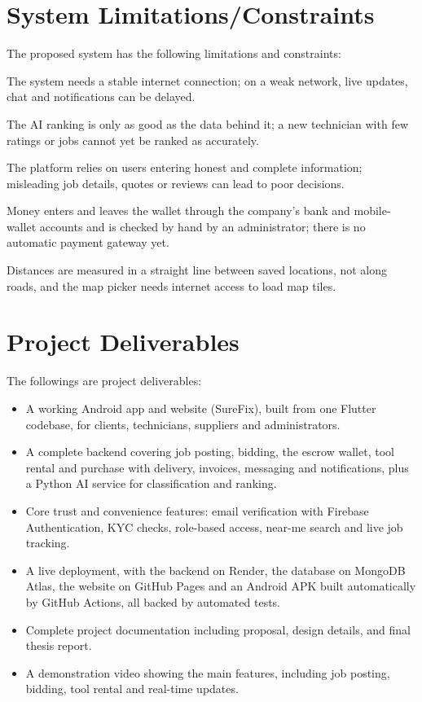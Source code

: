 \documentclass[A4paper,12pt]{report}
\theoremstyle{plain}
\theoremstyle{definition}
\theoremstyle{remark}
\numberwithin{equation}{section}
\begin{document}
\section{System Limitations/Constraints}
The proposed system has the following limitations and constraints:


\begin{description}[noitemsep,nolistsep,leftmargin=1cm]
	\item [L1] The system needs a stable internet connection; on a weak network, live updates, chat and notifications can be delayed.
	\item [L2] The AI ranking is only as good as the data behind it; a new technician with few ratings or jobs cannot yet be ranked as accurately.
    \item [L3] The platform relies on users entering honest and complete information; misleading job details, quotes or reviews can lead to poor decisions.
    	\item [L4] Money enters and leaves the wallet through the company's bank and mobile-wallet accounts and is checked by hand by an administrator; there is no automatic payment gateway yet.
    \item [L5] Distances are measured in a straight line between saved locations, not along roads, and the map picker needs internet access to load map tiles.
\end{description}


\section{Project Deliverables}
The followings are project deliverables:
\begin{itemize}
		\item A working Android app and website (SureFix), built from one Flutter codebase, for clients, technicians, suppliers and administrators.
	\item A complete backend covering job posting, bidding, the escrow wallet, tool rental and purchase with delivery, invoices, messaging and notifications, plus a Python AI service for classification and ranking.
    \item Core trust and convenience features: email verification with Firebase Authentication, KYC checks, role-based access, near-me search and live job tracking.
    \item A live deployment, with the backend on Render, the database on MongoDB Atlas, the website on GitHub Pages and an Android APK built automatically by GitHub Actions, all backed by automated tests.
    \item Complete project documentation including proposal, design details, and final thesis report.
    \item A demonstration video showing the main features, including job posting, bidding, tool rental and real-time updates.
\end{itemize}
\end{document}

